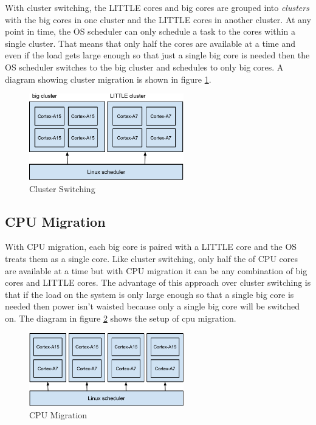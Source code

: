 \documentclass[11pt]{book}
\begin{document}
With cluster switching, the LITTLE cores and big cores are grouped into \emph{clusters} with the
big cores in one cluster and the LITTLE cores in another cluster. At any point in time, the OS
scheduler can only schedule a task to the cores within a single cluster. That means that
only half the cores are available at a time and even if the load gets large enough so that just a
single big core is needed then the OS scheduler switches to the big cluster and schedules to only
big cores. A diagram showing cluster migration is shown in figure \ref{cluster_switching}.

\begin{figure}
  \centering
  \includegraphics[width=0.6\textwidth]{figs/cluster_switching.pdf}
  \caption{Cluster Switching}\label{cluster_switching}
\end{figure}

\subsection{CPU Migration}

With CPU migration, each big core is paired with a LITTLE core and the OS treats them as a single
core. Like cluster switching, only half the of CPU cores are available at a time but with CPU
migration it can be any combination of big cores and LITTLE cores. The advantage of this approach
over cluster switching is that if the load on the system is only large enough so that a single big
core is needed then power isn't waisted because only a single big core will be switched on. The diagram
in figure \ref{cpu_migration} shows the setup of cpu migration.

\pagebreak

\begin{figure}
  \centering
  \includegraphics[width=0.6\textwidth]{figs/cpu_migration.pdf}
  \caption{CPU Migration}\label{cpu_migration}
\end{figure}
\end{document}
